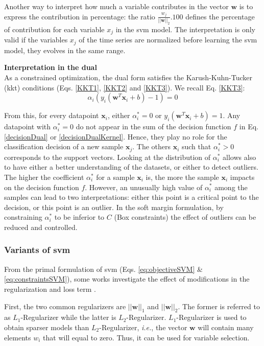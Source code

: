 Another way to interpret how much a variable contributes in the vector $\textbf{w}$ is to express the contribution in percentage: the ratio $\frac{w_j}{||\textbf{w}||_2} . 100$ defines the percentage of contribution for each variable $x_j$ in the {\sc svm} model. The interpretation is only valid if 
the variables $x_j$ of the time series are normalized before learning the {\sc svm} model, they evolves in the same range.



\noindent \textbf{Interpretation in the dual} \\
As a constrained optimization, the dual form satisfies the
Karush-Kuhn-Tucker ({\sc kkt}) conditions (Eqs. \ref{KKT1}, \ref{KKT2} and \ref{KKT3}). We recall Eq. \ref{KKT3}:
\begin{equation*}
	\alpha_i (y_i(\textbf{w}^T\textbf{x}_i+b)-1) = 0
\end{equation*}

From this, for every datapoint $\textbf{x}_i$, either $\alpha_i^* = 0$ or $y_i(\textbf{w}^T\textbf{x}_i+b) = 1$. Any datapoint with $\alpha_i^* = 0$ do not appear in the sum of the decision function $f$ in Eq. \ref{decisionDual} or \ref{decisionDualKernel}. Hence, they play no role for the classification decision of a new sample $\textbf{x}_j$. The others $\textbf{x}_i$ such that $\alpha_i^* > 0$ corresponds to the support vectors. Looking at the distribution of $\alpha_i^*$ allows also to have either a better understanding of the datasets, or either to detect outliers. The higher the coefficient $\alpha_i^*$ for a sample $\textbf{x}_i$ is, the more the sample $\textbf{x}_i$ impacts on the decision function $f$. However, an unusually high value of $\alpha_i^*$ among the samples can lead to two interpretations: either this point is a critical point to the decision, or this point is an outlier. In the soft margin formulation, by constraining $\alpha_i^*$ to be inferior to $C$ (Box constraints) the effect of outliers can be reduced and controlled. 

\subsubsection{Variants of {\sc svm}}
From the primal formulation of {\sc svm} (Eqs. \ref{eq:objectiveSVM} \& \ref{eq:constraintsSVM}), some works investigate the effect of modifications in the regularization and loss term \cite{Hsu2008}.

First, the two common regularizers are $||\textbf{w}||_1$ and $||\textbf{w}||_2$. The former is referred to as $L_1$-Regularizer while the latter is $L_2$-Regularizer. $L_1$-Regularizer is used to obtain sparser models than $L_2$-Regularizer, \textit{i.e.}, the vector $\textbf{w}$ will contain many elements $w_i$ that will equal to zero. Thus, it can be used for variable selection.

